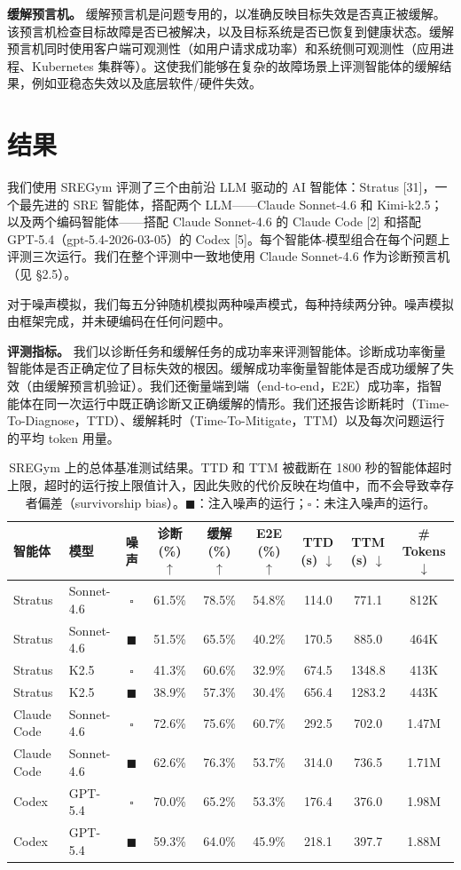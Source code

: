 \documentclass[11pt,UTF8,fontset=fandol]{ctexart}
\begin{document}
\textbf{缓解预言机。} 缓解预言机是问题专用的，以准确反映目标失效是否真正被缓解。该预言机检查目标故障是否已被解决，以及目标系统是否已恢复到健康状态。缓解预言机同时使用客户端可观测性（如用户请求成功率）和系统侧可观测性（应用进程、Kubernetes 集群等）。这使我们能够在复杂的故障场景上评测智能体的缓解结果，例如亚稳态失效以及底层软件/硬件失效。

\section{结果}

我们使用 SREGym 评测了三个由前沿 LLM 驱动的 AI 智能体：Stratus [31]，一个最先进的 SRE 智能体，搭配两个 LLM——Claude Sonnet-4.6 和 Kimi-k2.5；以及两个编码智能体——搭配 Claude Sonnet-4.6 的 Claude Code [2] 和搭配 GPT-5.4（gpt-5.4-2026-03-05）的 Codex [5]。每个智能体-模型组合在每个问题上评测三次运行。我们在整个评测中一致地使用 Claude Sonnet-4.6 作为诊断预言机（见 §2.5）。

对于噪声模拟，我们每五分钟随机模拟两种噪声模式，每种持续两分钟。噪声模拟由框架完成，并未硬编码在任何问题中。

\textbf{评测指标。} 我们以诊断任务和缓解任务的成功率来评测智能体。诊断成功率衡量智能体是否正确定位了目标失效的根因。缓解成功率衡量智能体是否成功缓解了失效（由缓解预言机验证）。我们还衡量端到端（end-to-end，E2E）成功率，指智能体在同一次运行中既正确诊断又正确缓解的情形。我们还报告诊断耗时（Time-To-Diagnose，TTD）、缓解耗时（Time-To-Mitigate，TTM）以及每次问题运行的平均 token 用量。

\begin{table}[H]\centering
\caption{SREGym 上的总体基准测试结果。TTD 和 TTM 被截断在 1800 秒的智能体超时上限，超时的运行按上限值计入，因此失败的代价反映在均值中，而不会导致幸存者偏差（survivorship bias）。$\blacksquare$：注入噪声的运行；$\square$：未注入噪声的运行。}
\label{tab:3}
\setlength{\tabcolsep}{4pt}
\begin{tabular}{llccccccc}
\toprule
智能体 & 模型 & 噪声 & 诊断 (\%) $\uparrow$ & 缓解 (\%) $\uparrow$ & E2E (\%) $\uparrow$ & TTD (s) $\downarrow$ & TTM (s) $\downarrow$ & \# Tokens $\downarrow$ \\
\midrule
Stratus & Sonnet-4.6 & $\square$ & 61.5\% & 78.5\% & 54.8\% & 114.0 & 771.1 & 812K \\
Stratus & Sonnet-4.6 & $\blacksquare$ & 51.5\% & 65.5\% & 40.2\% & 170.5 & 885.0 & 464K \\
Stratus & K2.5 & $\square$ & 41.3\% & 60.6\% & 32.9\% & 674.5 & 1348.8 & 413K \\
Stratus & K2.5 & $\blacksquare$ & 38.9\% & 57.3\% & 30.4\% & 656.4 & 1283.2 & 443K \\
Claude Code & Sonnet-4.6 & $\square$ & 72.6\% & 75.6\% & 60.7\% & 292.5 & 702.0 & 1.47M \\
Claude Code & Sonnet-4.6 & $\blacksquare$ & 62.6\% & 76.3\% & 53.7\% & 314.0 & 736.5 & 1.71M \\
Codex & GPT-5.4 & $\square$ & 70.0\% & 65.2\% & 53.3\% & 176.4 & 376.0 & 1.98M \\
Codex & GPT-5.4 & $\blacksquare$ & 59.3\% & 64.0\% & 45.9\% & 218.1 & 397.7 & 1.88M \\
\bottomrule
\end{tabular}
\end{table}
\end{document}
